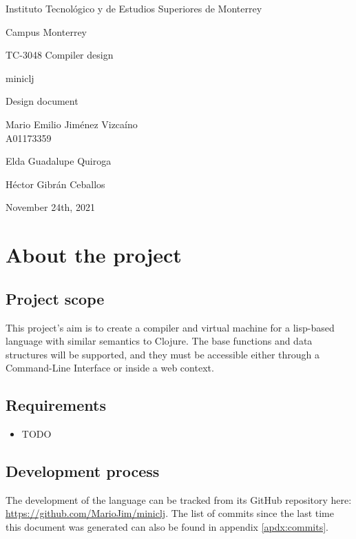 \documentclass[11pt]{scrreprt}
\begin{document}
\begin{titlepage}
    \centering
    \vspace{4\baselineskip}
    Instituto Tecnológico y de Estudios Superiores de Monterrey\par
    Campus Monterrey\par
    \vspace{2\baselineskip}
    {\large
    TC-3048 Compiler design}\par
    \vspace{6\baselineskip}
    {\huge
    miniclj\par}
    {\LARGE
    Design document\par}
    \vspace{4\baselineskip}
    {\Large
    Mario Emilio Jiménez Vizcaíno\\ A01173359\par}
    \vfill
    Elda Guadalupe Quiroga\par
    Héctor Gibrán Ceballos\par
    \vspace{4\baselineskip}
    November 24th, 2021
\end{titlepage}

\pagebreak

\tableofcontents

\pagebreak

\chapter{About the project}
\section{Project scope}
This project's aim is to create a compiler and virtual machine for a lisp-based language with similar semantics to Clojure. The base functions and data structures will be supported, and they must be accessible either through a Command-Line Interface or inside a web context.

\section{Requirements}
\begin{itemize}
  \item TODO
\end{itemize}

\section{Development process}
The development of the language can be tracked from its GitHub repository here: \\\url{https://github.com/MarioJim/miniclj}. The list of commits since the last time this document was generated can also be found in appendix \ref{apdx:commits}.
\end{document}
